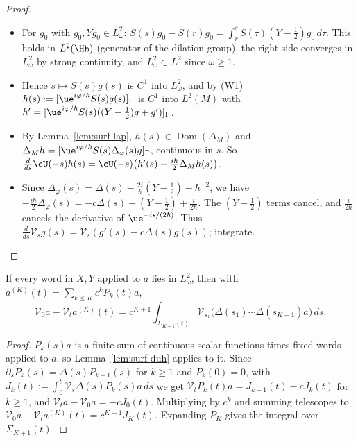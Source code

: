 \begin{proof}
\begin{itemize}
\item For $g_0$ with $g_0,Yg_0\in L^2_\omega$: $S(s)g_0-S(r)g_0=\int_r^sS(\tau)(Y-\tfrac12)g_0\,d\tau$. This holds in $L^2(\Hb)$ (generator of the dilation group), the right side converges in $L^2_\omega$ by strong continuity, and $L^2_\omega\subset L^2$ since $\omega\ge1$.
\item Hence $s\mapsto S(s)g(s)$ is $C^1$ into $L^2_\omega$, and by (W1) $h(s):=[\ue^{i\varphi/\hbar}S(s)g(s)]_\Gamma$ is $C^1$ into $L^2(M)$ with $h'=[\ue^{i\varphi/\hbar}S(s)((Y-\tfrac12)g+g')]_\Gamma$.
\item By Lemma~\ref{lem:surf-lap}, $h(s)\in\operatorname{Dom}(\Delta_M)$ and $\Delta_Mh=[\ue^{i\varphi/\hbar}S(s)\Delta_\varphi(s)g]_\Gamma$, continuous in $s$. So $\tfrac{d}{ds}\cU(-s)h(s)=\cU(-s)\bigl(h'(s)-\tfrac{i\hbar}{2}\Delta_Mh(s)\bigr)$.
\item Since $\Delta_\varphi(s)=\Delta(s)-\tfrac{2i}{\hbar}(Y-\tfrac12)-\hbar^{-2}$, we have $-\tfrac{i\hbar}{2}\Delta_\varphi(s)=-c\Delta(s)-(Y-\tfrac12)+\tfrac{i}{2\hbar}$. The $(Y-\tfrac12)$ terms cancel, and $\tfrac{i}{2\hbar}$ cancels the derivative of $\ue^{-is/(2\hbar)}$. Thus $\tfrac{d}{ds}\mathcal V_sg(s)=\mathcal V_s(g'(s)-c\Delta(s)g(s))$; integrate.\qedhere
\end{itemize}
\end{proof}

\begin{corollary}\label{cor:surf-dyson}
If every word in $X,Y$ applied to $a$ lies in $L^2_\omega$, then with $a^{(K)}(t)=\sum_{k\le K}c^kP_k(t)a$,
\[
\mathcal V_0a-\mathcal V_ta^{(K)}(t)=c^{K+1}\int_{\Sigma_{K+1}(t)}\mathcal V_{s_1}\bigl(\Delta(s_1)\cdots\Delta(s_{K+1})a\bigr)\,ds.
\]
\end{corollary}

\begin{proof}
$P_k(s)a$ is a finite sum of continuous scalar functions times fixed words applied to $a$, so Lemma~\ref{lem:surf-duh} applies to it. Since $\partial_sP_{k}(s)=\Delta(s)P_{k-1}(s)$ for $k\ge1$ and $P_k(0)=0$, with $J_k(t):=\int_0^t\mathcal V_s\Delta(s)P_k(s)a\,ds$ we get $\mathcal V_tP_k(t)a=J_{k-1}(t)-cJ_k(t)$ for $k\ge1$, and $\mathcal V_ta-\mathcal V_0a=-cJ_0(t)$. Multiplying by $c^k$ and summing telescopes to $\mathcal V_0a-\mathcal V_ta^{(K)}(t)=c^{K+1}J_K(t)$. Expanding $P_K$ gives the integral over $\Sigma_{K+1}(t)$.
\end{proof}

